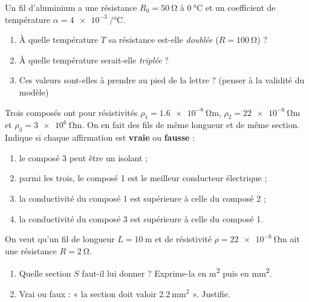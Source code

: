 \documentclass[11pt,a4paper]{article}
\begin{document}
\usetikzlibrary{babel}
\begin{exo}
Un fil d'aluminium a une résistance $R_0=\qty{50}{\ohm}$ à $\qty{0}{\degreeCelsius}$ et un coefficient
de température $\alpha=\qty{4e-3}{\per\degreeCelsius}$.
\begin{enumerate}[label=\alph*)]
  \item À quelle température $T$ sa résistance est-elle \emph{doublée} ($R=\qty{100}{\ohm}$) ?
  \item À quelle température serait-elle \emph{triplée} ?
  \item Ces valeurs sont-elles à prendre au pied de la lettre ? (penser à la validité du modèle)
\end{enumerate}
\end{exo}

\begin{exo}
Trois composés ont pour résistivités $\rho_1=\qty{1.6e-8}{\ohm\metre}$,
$\rho_2=\qty{22e-8}{\ohm\metre}$ et $\rho_3=\qty{3e6}{\ohm\metre}$. On en fait des fils de même
longueur et de même section. Indique si chaque affirmation est \textbf{vraie} ou \textbf{fausse} :
\begin{enumerate}[label=\alph*)]
  \item le composé 3 peut être un isolant ;
  \item parmi les trois, le composé 1 est le meilleur conducteur électrique ;
  \item la conductivité du composé 1 est supérieure à celle du composé 2 ;
  \item la conductivité du composé 3 est supérieure à celle du composé 1.
\end{enumerate}
\end{exo}

\begin{exo}
On veut qu'un fil de longueur $L=\qty{10}{\metre}$ et de résistivité $\rho=\qty{22e-8}{\ohm\metre}$ ait
une résistance $R=\qty{2}{\ohm}$.
\begin{enumerate}[label=\alph*)]
  \item Quelle section $S$ faut-il lui donner ? Exprime-la en \si{\metre\squared} puis en
        \si{\milli\metre\squared}.
  \item Vrai ou faux : « la section doit valoir $\qty{2.2}{\milli\metre\squared}$ ». Justifie.
\end{enumerate}
\end{exo}
\end{document}
